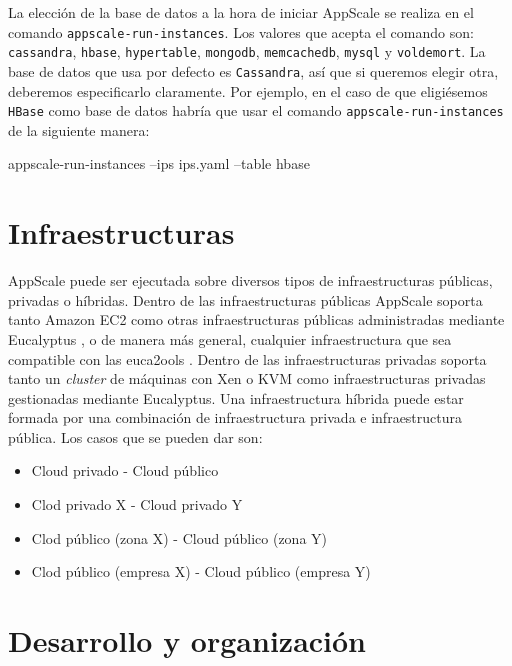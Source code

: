 La elección de la base de datos a la hora de iniciar AppScale se realiza en el comando \texttt{appscale-run-instances}. Los valores que acepta el comando son: \texttt{cassandra}, \texttt{hbase}, \texttt{hypertable}, \texttt{mongodb}, \texttt{memcachedb}, \texttt{mysql} y \texttt{voldemort}. La base de datos que usa por defecto es \texttt{Cassandra}, así que si queremos elegir otra, deberemos especificarlo claramente. Por ejemplo, en el caso de que eligiésemos \texttt{HBase} como base de datos habría que usar el comando \texttt{appscale-run-instances} de la siguiente manera:

\begin{bashcode}
appscale-run-instances --ips ips.yaml --table hbase
\end{bashcode}


\section{Infraestructuras}

AppScale puede ser ejecutada sobre diversos tipos de infraestructuras públicas, privadas o híbridas. Dentro de las infraestructuras públicas AppScale soporta tanto Amazon EC2 \cite{amazon-ec2} como otras infraestructuras públicas administradas mediante Eucalyptus \cite{eucalyptus}, o de manera más general, cualquier infraestructura que sea compatible con las euca2ools \cite{eucalyptus-euca2ools}. Dentro de las infraestructuras privadas soporta tanto un \emph{cluster} de máquinas con Xen o KVM como infraestructuras privadas gestionadas mediante Eucalyptus. Una infraestructura híbrida puede estar formada por una combinación de infraestructura privada e infraestructura pública. Los casos que se pueden dar son:

\begin{itemize}
\item Cloud privado - Cloud público
\item Clod privado X - Cloud privado Y
\item Clod público (zona X) - Cloud público (zona Y)
\item Clod público (empresa X) - Cloud público (empresa Y)
\end{itemize}


\section{Desarrollo y organización}

